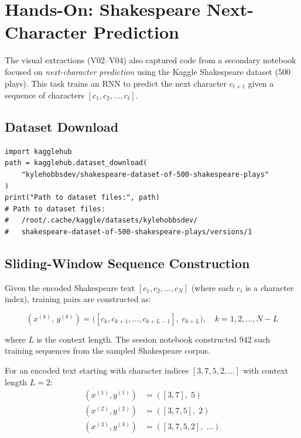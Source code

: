 \documentclass[12pt,a4paper]{article}
\begin{document}
\section{Hands-On: Shakespeare Next-Character Prediction}
\label{sec:shakespeare}

The visual extractions (V02--V04) also captured code from a
secondary notebook focused on \emph{next-character prediction} using
the Kaggle Shakespeare dataset (500 plays).  This task trains an RNN
to predict the next character $c_{t+1}$ given a sequence of
characters $[c_1, c_2, \ldots, c_t]$.

\subsection{Dataset Download}
\label{subsec:shakespeare_data}

\begin{verbatim}
import kagglehub
path = kagglehub.dataset_download(
    "kylehobbsdev/shakespeare-dataset-of-500-shakespeare-plays"
)
print("Path to dataset files:", path)
# Path to dataset files:
#   /root/.cache/kaggle/datasets/kylehobbsdev/
#   shakespeare-dataset-of-500-shakespeare-plays/versions/1
\end{verbatim}

\subsection{Sliding-Window Sequence Construction}
\label{subsec:sliding_window}

Given the encoded Shakespeare text $[c_1, c_2, \ldots, c_N]$ (where
each $c_i$ is a character index), training pairs are constructed as:

\begin{equation}
  (x^{(k)},\, y^{(k)}) = \bigl([c_k, c_{k+1}, \ldots, c_{k+L-1}],\;
                                 c_{k+L}\bigr), \quad
  k = 1, 2, \ldots, N - L
  \label{eq:sliding_window}
\end{equation}

where $L$ is the context length.  The session notebook constructed
942 such training sequences from the sampled Shakespeare corpus.

\begin{example}[title=Sliding Window Sequences]
  For an encoded text starting with character indices $[3, 7, 5, 2, \ldots]$
  with context length $L = 2$:
  \begin{align*}
    (x^{(1)}, y^{(1)}) &= ([3, 7],\; 5) \\
    (x^{(2)}, y^{(2)}) &= ([3, 7, 5],\; 2) \\
    (x^{(3)}, y^{(3)}) &= ([3, 7, 5, 2],\; \ldots)
  \end{align*}
\end{example}
\end{document}
